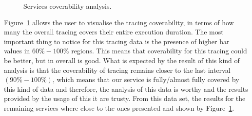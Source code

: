 \begin{figure}[H]
  \caption{Services coverability analysis.}
  \label{fig:services_coverability_analysis}
\end{figure}

Figure~\ref{fig:services_coverability_analysis} allows the user to visualise the tracing coverability, in terms of how many the overall tracing covers their entire execution duration. The most important thing to notice for this tracing data is the presence of higher bar values in $60\%-100\%$ regions. This means that coverability for this tracing could be better, but in overall is good. What is expected by the result of this kind of analysis is that the coverability of tracing remains closer to the last interval $(90\%-100\%)$, which means that our service is fully/almost fully covered by this kind of data and therefore, the analysis of this data is worthy and the results provided by the usage of this it are trusty. From this data set, the results for the remaining services where close to the ones presented and shown by Figure~\ref{fig:services_coverability_analysis}. 

